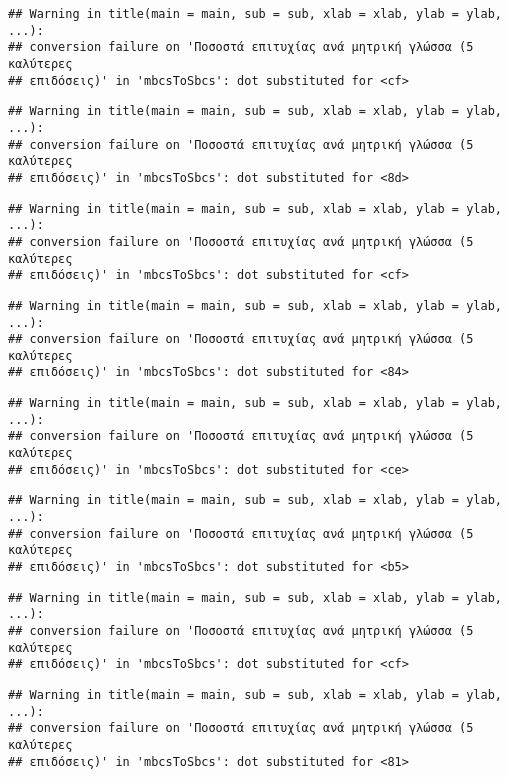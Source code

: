 \documentclass[
]{article}
\begin{document}
\begin{verbatim}
## Warning in title(main = main, sub = sub, xlab = xlab, ylab = ylab, ...):
## conversion failure on 'Ποσοστά επιτυχίας ανά μητρική γλώσσα (5 καλύτερες
## επιδόσεις)' in 'mbcsToSbcs': dot substituted for <cf>
\end{verbatim}

\begin{verbatim}
## Warning in title(main = main, sub = sub, xlab = xlab, ylab = ylab, ...):
## conversion failure on 'Ποσοστά επιτυχίας ανά μητρική γλώσσα (5 καλύτερες
## επιδόσεις)' in 'mbcsToSbcs': dot substituted for <8d>
\end{verbatim}

\begin{verbatim}
## Warning in title(main = main, sub = sub, xlab = xlab, ylab = ylab, ...):
## conversion failure on 'Ποσοστά επιτυχίας ανά μητρική γλώσσα (5 καλύτερες
## επιδόσεις)' in 'mbcsToSbcs': dot substituted for <cf>
\end{verbatim}

\begin{verbatim}
## Warning in title(main = main, sub = sub, xlab = xlab, ylab = ylab, ...):
## conversion failure on 'Ποσοστά επιτυχίας ανά μητρική γλώσσα (5 καλύτερες
## επιδόσεις)' in 'mbcsToSbcs': dot substituted for <84>
\end{verbatim}

\begin{verbatim}
## Warning in title(main = main, sub = sub, xlab = xlab, ylab = ylab, ...):
## conversion failure on 'Ποσοστά επιτυχίας ανά μητρική γλώσσα (5 καλύτερες
## επιδόσεις)' in 'mbcsToSbcs': dot substituted for <ce>
\end{verbatim}

\begin{verbatim}
## Warning in title(main = main, sub = sub, xlab = xlab, ylab = ylab, ...):
## conversion failure on 'Ποσοστά επιτυχίας ανά μητρική γλώσσα (5 καλύτερες
## επιδόσεις)' in 'mbcsToSbcs': dot substituted for <b5>
\end{verbatim}

\begin{verbatim}
## Warning in title(main = main, sub = sub, xlab = xlab, ylab = ylab, ...):
## conversion failure on 'Ποσοστά επιτυχίας ανά μητρική γλώσσα (5 καλύτερες
## επιδόσεις)' in 'mbcsToSbcs': dot substituted for <cf>
\end{verbatim}

\begin{verbatim}
## Warning in title(main = main, sub = sub, xlab = xlab, ylab = ylab, ...):
## conversion failure on 'Ποσοστά επιτυχίας ανά μητρική γλώσσα (5 καλύτερες
## επιδόσεις)' in 'mbcsToSbcs': dot substituted for <81>
\end{verbatim}
\end{document}
